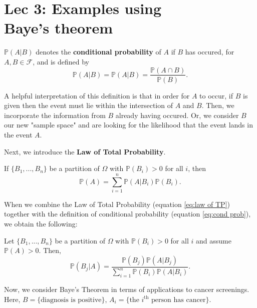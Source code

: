 

\chapter[Lec 3: Examples using Baye's theorem]{Lec 3: Examples using\\Baye's theorem}


\begin{definition}\label{defn:cond prob}
    \(\mathbb{P}(A|B)\) denotes the \textbf{conditional probability} of \(A\) if \(B\) has occured, 
    for \(A,B \in \mathcal{F}\), and is defined by 
    \begin{equation}\label{eq:cond prob}
        \mathbb{P}(A|B) = \mathbb{P}(A|B) = \frac{\mathbb{P}(A\cap B)}{\mathbb{P}(B)}.
    \end{equation}
\end{definition}

A helpful interpretation of this definition is that in order for \(A\) to occur, if \(B\) is given then the event must 
lie within the intersection of \(A\) and \(B\). Then, we incorporate the information from \(B\) already having occured. 
Or, we consider \(B\) our new "sample space" and are looking for the likelihood that the event lands in the event \(A\). 

\bigskip

Next, we introduce the \textbf{Law of Total Probability}. 

\begin{theorem}\label{thm:law of TP}
    If \(\{B_1,...,B_n\}\) be a partition of \(\Omega\) with \(\mathbb{P}(B_i)>0\) for all \(i\), then
    \begin{equation}\label{eq:law of TP}
        \mathbb{P}(A)= \sum_{i=1}^n \mathbb{P}(A|B_i)\mathbb{P}(B_i).
    \end{equation}
\end{theorem}

When we combine the Law of Total Probability (equation \ref{eq:law of TP}) together with the definition of conditional probability (equation \ref{eq:cond prob}), we obtain the following:

\begin{theorem}\label{thm:Baye's}
    Let \(\{B_1,...,B_n\}\) be a partition of \(\Omega\) with \(\mathbb{P}(B_i)>0\) for all \(i\) and assume \(\mathbb{P}(A)>0\). Then, 
    \begin{equation}\label{eq:Baye's}
        \mathbb{P}(B_j|A) = \frac{\mathbb{P}(B_j)\mathbb{P}(A|B_j)}{\sum_{i=1}^n \mathbb{P}(B_i)\mathbb{P}(A|B_i)}.
    \end{equation}
\end{theorem}

Now, we consider Baye's Theorem in terms of applications to cancer screenings. 
Here, \(B = \{\text{diagnosis is positive}\}\), \(A_i = \{\text{the }i^{\text{th}} \text{ person has cancer}\}\). 




